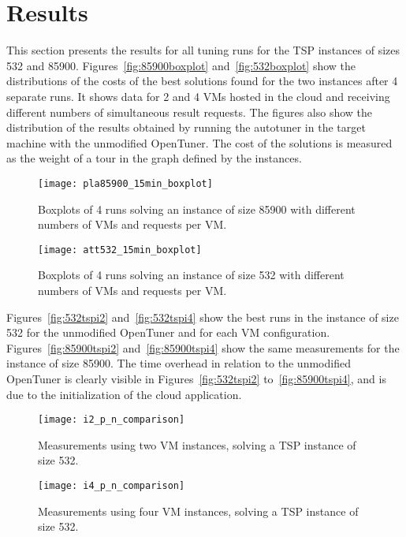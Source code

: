 \section{Results} \label{sec:results}

This section presents the results for all tuning runs for the TSP instances of
sizes 532 and 85900.  Figures~\ref{fig:85900boxplot} and~\ref{fig:532boxplot}
show the distributions of the costs of the best solutions found for the two
instances after 4 separate runs. It shows data for 2 and 4 VMs
hosted in the cloud and receiving different numbers of simultaneous result
requests.  The figures also show the distribution of the results obtained by
running the autotuner in the target machine with the unmodified OpenTuner.  The
cost of the solutions is measured as the weight of a tour in the graph defined
by the instances.


\begin{figure}[htpb]
    \centering
    \begin{minipage}{.48\textwidth}
        \centering
        \texttt{[image: pla85900\_15min\_boxplot]}
        \caption{Boxplots of 4 runs solving an instance of size 85900 with
                 different numbers of VMs and requests per VM.}
        \label{fig:85900boxplot}
    \end{minipage}%
    \hfill
    \begin{minipage}{.48\textwidth}
        \centering
        \texttt{[image: att532\_15min\_boxplot]}
        \caption{Boxplots of 4 runs solving an instance of size 532 with
                 different numbers of VMs and requests per VM.}
        \label{fig:532boxplot}
    \end{minipage}%
    \label{fig:boxplots}
\end{figure}

Figures~\ref{fig:532tspi2} and~\ref{fig:532tspi4} show the best
runs in the instance of size 532 for the unmodified OpenTuner and
for each VM configuration.
Figures~\ref{fig:85900tspi2} and~\ref{fig:85900tspi4} show the same
measurements for the instance of size 85900.
The time overhead in relation to the unmodified OpenTuner is clearly
visible in Figures~\ref{fig:532tspi2} to~\ref{fig:85900tspi4}, and is
due to the initialization of the cloud application.

\begin{figure}[htpb]
    \centering
    \begin{minipage}{.48\textwidth}
        \centering
        \texttt{[image: i2\_p\_n\_comparison]}
        \caption{Measurements using two VM instances, solving
                 a TSP instance of size 532.}
        \label{fig:532tspi2}
    \end{minipage}%
    \hfill
    \begin{minipage}{.48\textwidth}
        \centering
        \texttt{[image: i4\_p\_n\_comparison]}
        \caption{Measurements using four VM instances,
                 solving a TSP instance of size 532.}
        \label{fig:532tspi4}
    \end{minipage}%
    \label{fig:532tsp}
\end{figure}

